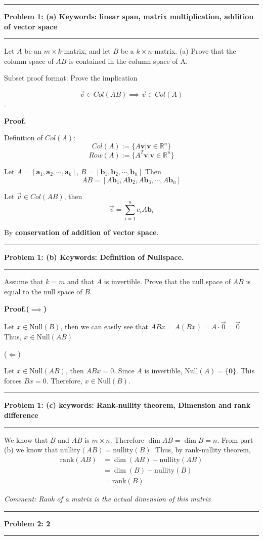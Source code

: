 \documentclass[11pt]{article}
\newcommand\question[2]{\vspace{.25in}\hrule\textbf{#1: #2}\vspace{.5em}\hrule\vspace{.10in}}
\begin{document}
\raggedright
\newcommand\NAME{Carl Kingsford}  %
\newcommand\ANDREWID{ckingsf}     %
\newcommand\HWNUM{1}              %

\newcommand{\sumn}{\sum_{n=0}^{\infty}}
\newcommand{\ea}{e^{\alpha}}
\newcommand{\nea}{e^{-\alpha}}
\newcommand{\vecv}{\mathbf{v}}
\newcommand{\veca}{\mathbf{a}}
\newcommand{\vecb}{\mathbf{b}}
\newcommand{\rank}{\mathrm{rank}}
\newcommand{\nullity}{\mathrm{nullity}}


\question{Problem 1}{(a) Keywords: linear span, matrix multiplication, addition of vector space}

Let $A$ be an $m \times k$-matrix, and let $B$ be a $k \times n$-matrix.
(a) Prove that the column space of $AB$ is contained in the column space of A.

Subset proof format: Prove the implication 

\[\vec{v} \in Col(AB) \implies \vec{v} \in Col(A)\].

\textbf{Proof.}

Definition of $Col(A)$:
\[Col(A) := \{A\vecv| \vecv \in \mathbb{R}^n\}\]
\[Row(A) := \{A^T\vecv| \vecv \in \mathbb{R}^n\}\]

Let $A = [\veca_1, \veca_2, \cdots, \veca_{k}]$, $B = [\vecb_1, \vecb_2, \cdots, \vecb_{n}]$
Then
\[AB = [A\vecb_1, A\vecb_2, A\vecb_3,\cdots, A\vecb_n]\]

Let $\vec{v} \in Col(AB)$, then
\[\vec{v} = \sum_{i=1}^{n}c_iA\vecb_i\]

By \textbf{conservation of addition of vector space}.

\question{Problem 1}{(b) Keywords: Definition of Nullspace.}
Assume that $k = m$ and that $A$ is invertible. Prove that the null space of $AB$ is equal to the null space of $B$.

\textbf{Proof.($\implies$)}

Let $x\in \mathrm{Null}(B)$, then we can easily see that $ABx=A(Bx)=A\cdot\vec{0}=\vec{0}$
Thus, $x\in \mathrm{Null}(AB)$

($\Longleftarrow$)

Let $x\in \mathrm{Null}(AB)$, then $ABx = 0$.
Since $A$ is invertible, $\mathrm{Null}(A) = \{\mathbf{0}\}$.
This forces $Bx=0$. Therefore, $x\in \mathrm{Null}(B)$.
\question{Problem 1}{(c) keywords: Rank-nullity theorem, Dimension and rank difference}
We know that $B$ and $AB$ is $m\times n$.
Therefore $\dim{AB}=\dim{B} = n$.
From part (b) we know that $\nullity(AB)=\nullity(B)$.
Thus, by rank-nullity theorem,
\begin{align*}
    \rank(AB)&=\dim(AB)-\nullity(AB)\\
             &=\dim(B)-\nullity(B)\\
             &=\rank(B)
\end{align*}

\textit{Comment: Rank of a matrix is the actual dimension of this matrix} 

\question{Problem 2}{2}
\end{document}
